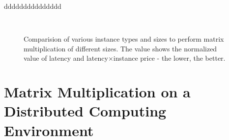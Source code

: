 \documentclass[10pt, conference, compsocconf]{IEEEtran}
\begin{document}
ddddddddddddddd
\begin{figure}[!ht]
  \centering
  \\
\caption{\label{fig:instance-blocks-sizes-compare}Comparision of various instance types and sizes to perform matrix multiplication of different sizes. The value shows the normalized value of latency and latency$\times$instance price - the lower, the better.}
\end{figure}

\section{Matrix Multiplication on a Distributed Computing Environment}\label{sec:distributed-matrix-computation}

\end{document}
